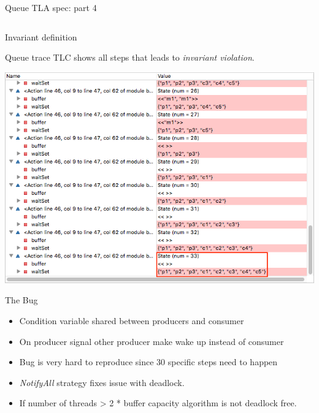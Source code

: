 \documentclass[12pt]{beamer}
\begin{document}
  \begin{frame}{Queue TLA spec: part 4}
      \begin{center}
          \inputminted[firstline=43,lastline=50,linenos,
            fontsize=\scriptsize]{tla}{figures/buffer.tla}
      \end{center}
      Invariant definition
  \end{frame}
  \begin{frame}{Queue trace}
      TLC shows all steps that leads to \textit{invariant violation}.
      \begin{center}
          \includegraphics[scale=0.42]{figures/buffer_trace}
      \end{center}
  \end{frame}
  \begin{frame}{The Bug}
    \begin{itemize}
      \item Condition variable shared between producers and consumer
      \item On producer signal other producer make wake up instead of consumer
      \item Bug is very hard to reproduce since 30 specific steps need to happen
      \item \textit{NotifyAll} strategy fixes issue with deadlock.
      \item If number of threads > 2 * buffer capacity algorithm is not deadlock free.
    \end{itemize}
  \end{frame}
\end{document}
